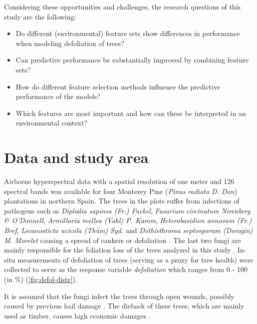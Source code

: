 \documentclass[journal]{IEEEtran}
\begin{document}
Considering these opportunities and challenges, the research questions of this study are the following:

\begin{itemize}

	\item Do different (environmental) feature sets show differences in performance when modeling defoliation of trees?

	\item Can predictive performance be substantially improved by combining feature sets?

	\item How do different feature selection methods influence the predictive performance of the models?

	\item Which features are most important and how can these be interpreted in an environmental context?

\end{itemize}

\section{Data and study area}

Airborne hyperspectral data with a spatial resolution of one meter and 126 spectral bands was available for four Monterey Pine (\textit{Pinus radiata D. Don}) plantations in northern Spain.
The trees in the plots suffer from infections of pathogens such as \textit{Diplodia sapinea (Fr.) Fuckel}, \textit{Fusarium circinatum Nirenberg \& O'Donnell}, \textit{Armillaria mellea (Vahl) P. Kumm}, \textit{Heterobasidion annosum (Fr.) Bref}, \textit{Lecanosticta acicola (Thüm) Syd.} and \textit{Dothisthroma septosporum (Dorogin) M. Morelet} causing a spread of cankers or defoliation \cite{mesanza2016, iturritxa2017}.
The last two fungi are mainly responsible for the foliation loss of the trees analyzed in this study \cite{iturritxa2014}.
In-situ measurements of defoliation of trees (serving as a proxy for tree health) were collected to serve as the response variable \textit{defoliation} which ranges from 0 - 100 (in \%) (\autoref{fig:defol-distr}).

It is assumed that the fungi infect the trees through open wounds, possibly caused by previous hail damage \cite{iturritxa2014}.
The dieback of these trees, which are mainly used as timber, causes high economic damages \cite{ganley2009}.
\end{document}

